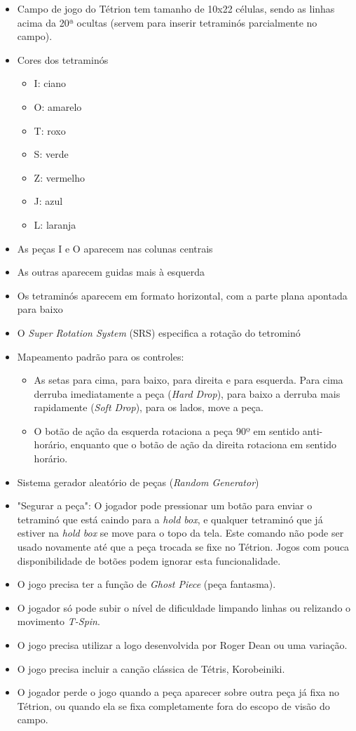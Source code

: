 \documentclass[
	12pt,				%
	openright,			%
	oneside,			%
	a4paper,			%
	brazil,				%
	]{abntex2}
\begin{document}
\begin{itemize}
  \item Campo de jogo do Tétrion tem tamanho de 10x22 células, sendo as linhas acima da 20ª ocultas (servem para inserir tetraminós parcialmente no campo).
  \item Cores dos tetraminós
  \begin{itemize}
  	\item I: ciano
  	\item O: amarelo
  	\item T: roxo
  	\item S: verde
  	\item Z: vermelho
  	\item J: azul
  	\item L: laranja
  \end{itemize}
  \item As peças I e O aparecem nas colunas centrais
  \item As outras aparecem guidas mais à esquerda
  \item Os tetraminós aparecem em formato horizontal, com a parte plana apontada para baixo
  \item O \textit{Super Rotation System} (SRS) especifica a rotação do tetrominó
  \item Mapeamento padrão para os controles:
  \begin{itemize}
   	\item As setas para cima, para baixo, para direita e para esquerda. Para cima derruba imediatamente a peça (\textit{Hard Drop}), para baixo a derruba mais rapidamente (\textit{Soft Drop}), para os lados, move a peça.
   	\item O botão de ação da esquerda rotaciona a peça 90º em sentido anti-horário, enquanto que o botão de ação da direita rotaciona em sentido horário.
  \end{itemize}
  \item Sistema gerador aleatório de peças (\textit{Random Generator})
  \item "Segurar a peça": O jogador pode pressionar um botão para enviar o tetraminó que está caindo para a \textit{hold box}, e qualquer tetraminó que já estiver na \textit{hold box} se move para o topo da tela. Este comando não pode ser usado novamente até que a peça trocada se fixe no Tétrion. Jogos com pouca disponibilidade de botões podem ignorar esta funcionalidade.
  \item O jogo precisa ter a função de \textit{Ghost Piece} (peça fantasma).
  \item O jogador só pode subir o nível de dificuldade limpando linhas ou relizando o movimento \textit{T-Spin}.
  \item O jogo precisa utilizar a logo desenvolvida por Roger Dean ou uma variação.
  \item O jogo precisa incluir a canção clássica de Tétris, Korobeiniki.
  \item O jogador perde o jogo quando a peça aparecer sobre outra peça já fixa no Tétrion, ou quando ela se fixa completamente fora do escopo de visão do campo.
\end{itemize}
\end{document}
